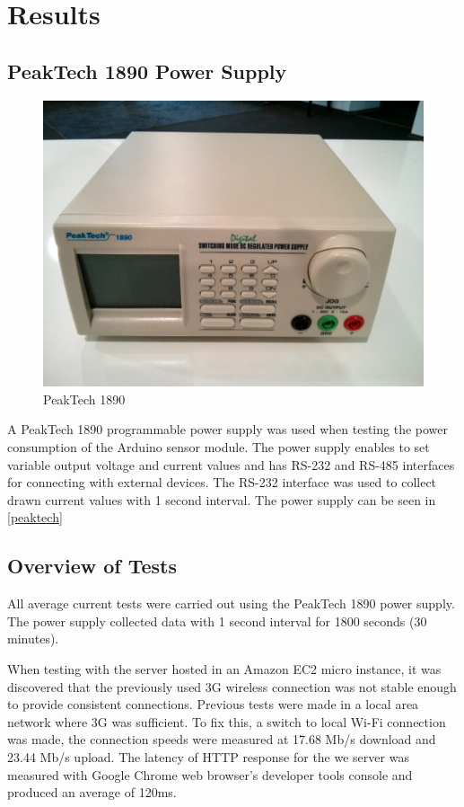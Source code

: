 \section{Results}

\subsection{PeakTech 1890 Power Supply}

\begin{figure}[h]
\centering
\includegraphics[scale=0.48]{4/figures/peaktech.pdf}
\caption{PeakTech 1890}
\label{peaktech}
\end{figure}

A PeakTech 1890 programmable power supply was used when testing the power consumption of the Arduino sensor module. The power supply enables to set variable output voltage and current values and has RS-232 and RS-485 interfaces for connecting with external devices. The RS-232 interface was used to collect drawn current values with 1 second interval. The power supply can be seen in \autoref{peaktech}

\subsection{Overview of Tests}

All average current tests were carried out using the PeakTech 1890 power supply. The power supply collected data with 1 second interval for 1800 seconds (30 minutes).

When testing with the server hosted in an Amazon EC2 micro instance, it was discovered that the previously used 3G wireless connection was not stable enough to provide consistent connections. Previous tests were made in a local area network where 3G was sufficient. To fix this, a switch to local Wi-Fi connection was made, the connection speeds were measured at 17.68 Mb/s download and 23.44 Mb/s upload. The latency of HTTP response for the we server was measured with Google Chrome web browser's developer tools console and produced an average of 120ms. 

